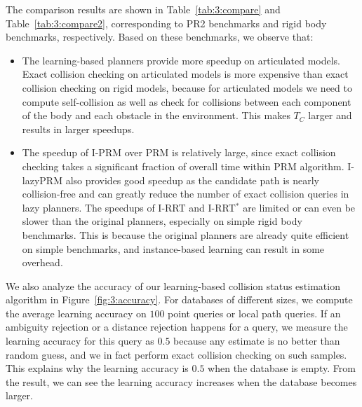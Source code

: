 The comparison results are shown in Table~\ref{tab:3:compare} and Table~\ref{tab:3:compare2}, corresponding to PR2 benchmarks and rigid body benchmarks, respectively. Based on these benchmarks, we observe that:
\begin{itemize}
\item The learning-based planners provide more speedup on articulated models. Exact collision checking on articulated models is more expensive than exact collision checking on rigid models, because for articulated models we need to compute self-collision as well as check for collisions between each component of the body and each obstacle in the environment. This makes $T_C$ larger and results in larger speedups.
\item The speedup of I-PRM over PRM is relatively large, since exact collision checking takes a significant fraction of overall time within PRM algorithm. I-lazyPRM also provides good speedup as the candidate path is nearly collision-free and can greatly reduce the number of exact collision queries in lazy planners. The speedups of I-RRT and I-RRT${}^*$ are limited or can even be slower than the original planners, especially on simple rigid body benchmarks. This is because the original planners are already quite efficient on simple benchmarks, and instance-based learning can result in some overhead.
\end{itemize}


We also analyze the accuracy of our learning-based collision status estimation algorithm in Figure~\ref{fig:3:accuracy}. For databases of different sizes, we compute the average learning accuracy on $100$ point queries or local path queries. If an ambiguity rejection or a distance rejection happens for a query, we measure the learning accuracy for this query as $0.5$ because any estimate is no better than random guess, and we in fact perform exact collision checking on such samples. This explains why the learning accuracy is $0.5$ when the database is empty. From the result, we can see the learning accuracy increases when the database becomes larger.


